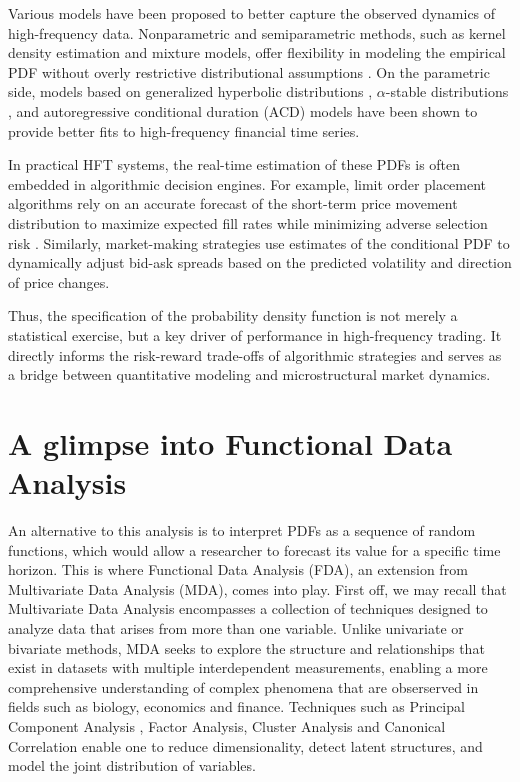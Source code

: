 \documentclass[
	12pt,				%
	oneside,			%
	a4paper,			%
	english,			%
	brazil				%
	]{abntex2ppgsi}
\begin{document}
Various models have been proposed to better capture the observed dynamics of high-frequency data. Nonparametric and semiparametric methods, such as kernel density estimation and mixture models, offer flexibility in modeling the empirical PDF without overly restrictive distributional assumptions \cite{fan2003nonlinear}. On the parametric side, models based on generalized hyperbolic distributions \cite{prause1999generalized}, $\alpha$-stable distributions \cite{nolan2003modeling}, and autoregressive conditional duration (ACD) models \cite{engle1998autoregressive} have been shown to provide better fits to high-frequency financial time series.

In practical HFT systems, the real-time estimation of these PDFs is often embedded in algorithmic decision engines. For example, limit order placement algorithms rely on an accurate forecast of the short-term price movement distribution to maximize expected fill rates while minimizing adverse selection risk \cite{cartea2015algorithmic}. Similarly, market-making strategies use estimates of the conditional PDF to dynamically adjust bid-ask spreads based on the predicted volatility and direction of price changes.

Thus, the specification of the probability density function is not merely a statistical exercise, but a key driver of performance in high-frequency trading. It directly informs the risk-reward trade-offs of algorithmic strategies and serves as a bridge between quantitative modeling and microstructural market dynamics.

\section{A glimpse into Functional Data Analysis}
An alternative to this analysis is to interpret PDFs as a sequence of random functions, which would allow a researcher to forecast its value for a specific time horizon. This is where Functional Data Analysis (FDA), an extension from Multivariate Data Analysis (MDA), comes into play. First off, we may recall that Multivariate Data Analysis encompasses a collection of techniques designed to analyze data that arises from more than one variable. Unlike univariate or bivariate methods, MDA seeks to explore the structure and relationships that exist in datasets with multiple interdependent measurements, enabling a more comprehensive understanding of complex phenomena that are obserserved in fields such as biology, economics and finance. Techniques such as Principal Component Analysis \cite{pearson1901lines}, Factor Analysis, Cluster Analysis and Canonical Correlation \cite{hotelling1936relations} enable one to reduce dimensionality, detect latent structures, and model the joint distribution of variables.
\end{document}
